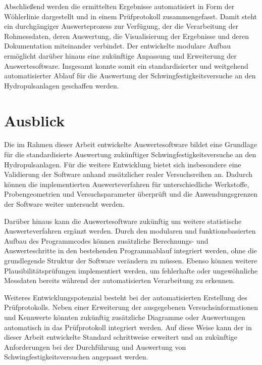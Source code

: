 Abschließend werden die ermittelten Ergebnisse automatisiert in Form der Wöhlerlinie 
dargestellt und in einem Prüfprotokoll zusammengefasst. Damit steht ein durchgängiger 
Auswerteprozess zur Verfügung, der die Verarbeitung der Rohmessdaten, deren Auswertung, 
die Visualisierung der Ergebnisse und deren Dokumentation miteinander verbindet. 
Der entwickelte modulare Aufbau ermöglicht darüber hinaus eine zukünftige Anpassung 
und Erweiterung der Auswertesoftware. Insgesamt konnte somit ein standardisierter 
und weitgehend automatisierter Ablauf für die Auswertung der Schwingfestigkeitsversuche 
an den Hydropulsanlagen geschaffen werden.

\section{Ausblick}

Die im Rahmen dieser Arbeit entwickelte Auswertesoftware bildet eine Grundlage für 
die standardisierte Auswertung zukünftiger Schwingfestigkeitsversuche an den 
Hydropulsanlagen. Für die weitere Entwicklung bietet sich insbesondere eine 
Validierung der Software anhand zusätzlicher realer Versuchsreihen an. Dadurch 
können die implementierten Auswerteverfahren für unterschiedliche Werkstoffe, 
Probengeometrien und Versuchsparameter überprüft und die Anwendungsgrenzen der 
Software weiter untersucht werden.

Darüber hinaus kann die Auswertesoftware zukünftig um weitere statistische 
Auswerteverfahren ergänzt werden. Durch den modularen und funktionsbasierten Aufbau 
des Programmcodes können zusätzliche Berechnungs- und Auswerteschritte in den 
bestehenden Programmablauf integriert werden, ohne die grundlegende Struktur der 
Software verändern zu müssen. Ebenso können weitere Plausibilitätsprüfungen 
implementiert werden, um fehlerhafte oder ungewöhnliche Messdaten bereits während 
der automatisierten Verarbeitung zu erkennen.

Weiteres Entwicklungspotenzial besteht bei der automatisierten Erstellung des 
Prüfprotokolls. Neben einer Erweiterung der ausgegebenen Versuchsinformationen und 
Kennwerte könnten zukünftig zusätzliche Diagramme oder Auswertungen automatisch in 
das Prüfprotokoll integriert werden. Auf diese Weise kann der in dieser Arbeit 
entwickelte Standard schrittweise erweitert und an zukünftige Anforderungen bei 
der Durchführung und Auswertung von Schwingfestigkeitsversuchen angepasst werden.
